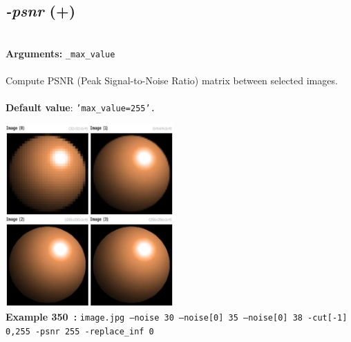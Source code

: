 \documentclass[a4paper,11pt,twoside]{book}
\begin{document}
\subsection{\emph{-psnr} (+)}\vspace*{-0.5em}
~\\\textbf{Arguments: } 
{\small \texttt{\_max\_value}}\\~\\
Compute PSNR (Peak Signal-to-Noise Ratio) matrix between selected images.
~\\~\\\textbf{Default value}: {\small \texttt{'max\_value=255'.}}
\begin{center}\includegraphics[keepaspectratio=true,height=7cm,width=\textwidth]{img/gmic_def350.jpg}\\
{\footnotesize \textbf{Example 350~:} \texttt{image.jpg --noise 30 --noise[0] 35 --noise[0] 38 -cut[-1] 0,255 -psnr 255 -replace\_inf 0}}
\end{center}
\end{document}
